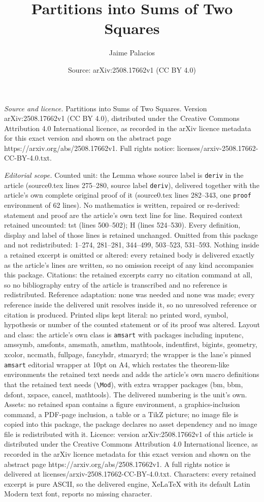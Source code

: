 \documentclass[10pt,a4paper]{amsart}
\title[Partitions into Sums of Two Squares]{Partitions into Sums of Two Squares}
\author{Jaime Palacios}
\date{Source: arXiv:2508.17662v1 (CC BY 4.0)}
\begin{document}
\maketitle

\noindent\emph{Source and licence.} Partitions into Sums of Two Squares. Version arXiv:2508.17662v1 (CC BY 4.0), distributed under the Creative Commons Attribution 4.0 International licence, as recorded in the arXiv licence metadata for this exact version and shown on the abstract page https://arxiv.org/abs/2508.17662v1. Full rights notice: licenses/arxiv-2508.17662-CC-BY-4.0.txt.\par\smallskip

\noindent\textit{Editorial scope.} Counted unit: the Lemma whose source label is \texttt{deriv} in the article (source0.tex lines 275--280, source label \texttt{deriv}), delivered together with the article's own complete original proof of it (source0.tex lines 282--343, one \texttt{proof} environment of 62 lines). No mathematics is written, repaired or re-derived: statement and proof are the article's own text line for line. Required context retained uncounted: tst (lines 500--502); H (lines 524--530). Every definition, display and label of those lines is retained unchanged. Omitted from this package and not redistributed: 1--274, 281--281, 344--499, 503--523, 531--593. Nothing inside a retained excerpt is omitted or altered: every retained body is delivered exactly as the article's lines are written, so no omission receipt of any kind accompanies this package. Citations: the retained excerpts carry no citation command at all, so no bibliography entry of the article is transcribed and no reference is redistributed. Reference adaptation: none was needed and none was made; every reference inside the delivered unit resolves inside it, so no unresolved reference or citation is produced. Printed slips kept literal: no printed word, symbol, hypothesis or number of the counted statement or of its proof was altered. Layout and class: the article's own class is \texttt{amsart} with packages including inputenc, amssymb, amsfonts, amsmath, amsthm, mathtools, indentfirst, bigints, geometry, xcolor, nccmath, fullpage, fancyhdr, stmaryrd; the wrapper is the lane's pinned \texttt{amsart} editorial wrapper at 10pt on A4, which restates the theorem-like environments the retained text needs and adds the article's own macro definitions that the retained text needs (\texttt{\textbackslash Mod}), with extra wrapper packages (bm, bbm, dsfont, xspace, cancel, mathtools). The delivered numbering is the unit's own. Assets: no retained span contains a figure environment, a graphics-inclusion command, a PDF-page inclusion, a table or a TikZ picture; no image file is copied into this package, the package declares no asset dependency and no image file is redistributed with it. Licence: version arXiv:2508.17662v1 of this article is distributed under the Creative Commons Attribution 4.0 International licence, as recorded in the arXiv licence metadata for this exact version and shown on the abstract page https://arxiv.org/abs/2508.17662v1. A full rights notice is delivered at licenses/arxiv-2508.17662-CC-BY-4.0.txt. Characters: every retained excerpt is pure ASCII, so the delivered engine, XeLaTeX with its default Latin Modern text font, reports no missing character.
\end{document}
